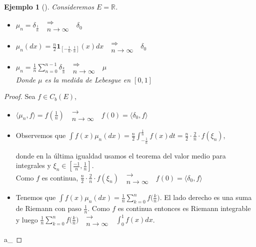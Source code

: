 \documentclass[letterpaper,11pt]{article} %
\theoremstyle{defbreak}
\newtheorem{example}{Ejemplo}[subsection]
\theoremstyle{propbreak}
\theoremstyle{remark}
\theoremstyle{break}
\def\conv{\mbox{ }\substack{\longrightarrow \\ n\to\infty}\mbox{ }}
\def\beforeitemize{\leavevmode \vspace{-0.5\baselineskip}}
\def\gris{\color{mygray}}
\def\negro{\color{black}}
\def\findem{\null\hfill\color{white}a\color{black}_\square}
\begin{document}
\begin{example}[\label{ejemplo:1_2_1}] 
Consideremos $E=\mathbb{R}$.
\begin{itemize} %
    \item[(i)] $\mu_n=\delta_{\frac{1}{n}} \mbox{ }\substack{\Longrightarrow \\n \to \infty}\mbox{ } \delta_0$ 
    \item[(ii)] $\displaystyle\mu_n(dx) = \frac{n}{2}\mathbf{1}_{[-\frac{1}{n},\frac{1}{n}]}(x)dx \mbox{ }\substack{\Longrightarrow \\n \to \infty}\mbox{ } \delta_0$
    \item[(iii)] $\displaystyle\mu_n=\frac{1}{n}\sum_{n=0}^{n-1}\delta_{\frac{k}{n}} \mbox{ }\substack{\Longrightarrow \\n \to \infty}\mbox{ } \mu$ %
    \\ Donde $\mu$ es la medida de Lebesgue en $[0,1]$
\end{itemize}
\end{example}
\begin{proof}
\gris Sea $f\in C_b(E)$, %
\begin{itemize}
    \item[(i)] $\langle \mu_n,f\rangle=f(\frac{1}{n})\conv f(0)=\langle \delta_0,f\rangle$
    \item[(ii)] Observemos que 
    $\displaystyle\int f(x)\mu_n(dx)=\frac{n}{2}\int^{\frac{1}{n}}_{-\frac{1}{n}}f(x)dt = \frac{n}{2}\cdot\frac{2}{n}\cdot f(\xi_n)$,
    
    donde en la última igualdad usamos el teorema del valor medio para integrales y $\xi_n\in[\frac{-1}{n},\frac{1}{n}]$.
    \\ Como $f$ es continua, $\frac{n}{2}\cdot\frac{2}{n}\cdot f(\xi_n) \conv f(0)=\langle \delta_0,f \rangle$
    \item[(iii)] Tenemos que $\displaystyle\int f(x)\mu_n(dx) = \frac{1}{n}\sum^n_{k=0}f\bigg(\frac{k}{n}\bigg)$. El lado derecho es una suma de Riemann con paso $\frac{1}{n}$. Como $f$ es continua entonces es Riemann integrable y luego $\displaystyle \frac{1}{n}\sum^n_{k=0}f\bigg(\frac{k}{n}\bigg) \conv \int_0^1 f(x)dx$.
\end{itemize} 
\findem
\negro \end{proof}
\end{document}
